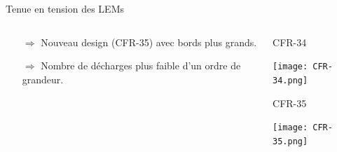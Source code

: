 \begin{frame}{Tenue en tension des LEMs}
\begin{columns}
\begin{column}{0.5\textwidth}
\begin{scriptsize}
\begin{itemize}
	    				\item[$\Rightarrow$] Nouveau design (CFR-35) avec bords plus grands.
	    				\item[$\Rightarrow$] Nombre de décharges plus faible d'un ordre de grandeur.
	    			\end{itemize}
	    		\end{scriptsize}
    		\end{column}\hfill
    		\begin{column}{0.5\textwidth}
    			\begin{minipage}{0.48\textwidth}
    				\centering
    				\begin{scriptsize}
	    				CFR-34
	    			\end{scriptsize}
    				\texttt{[image: CFR-34.png]}
    			\end{minipage}\hfill
    			\begin{minipage}{0.48\textwidth}
    				\centering
    				\begin{scriptsize}
	    				CFR-35
    				\end{scriptsize}
    				\texttt{[image: CFR-35.png]}
    			\end{minipage}
    		\end{column}
    	\end{columns}
    \end{frame}

